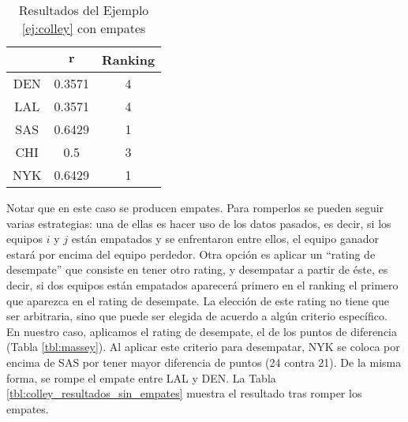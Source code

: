 \begin{ejemplo}
\begin{table}[h]
\centering
\caption{Resultados del Ejemplo \ref{ej:colley} con empates}
\label{tbl:colley_con_empates}
\begin{tabular}{@{}ccc@{}}
\cmidrule(l){2-3}
    & $\mathbf{r}$ & Ranking \\ \midrule
DEN & 0.3571       & 4       \\
LAL & 0.3571       & 4       \\
SAS & 0.6429       & 1       \\
CHI & 0.5          & 3       \\
NYK & 0.6429       & 1       \\ \bottomrule
\end{tabular}
\end{table}

Notar que en este caso se producen empates. Para romperlos se pueden seguir varias estrategias: una de ellas es hacer uso de los datos pasados, es decir, si los equipos $i$ y $j$ están empatados y se enfrentaron entre ellos, el equipo ganador estará por encima del equipo perdedor. Otra opción es aplicar un ``rating de desempate'' que consiste en tener otro rating, y desempatar a partir de éste, es decir, si dos equipos están empatados aparecerá primero en el ranking el primero que aparezca en el rating de desempate. La elección de este rating no tiene que ser arbitraria, sino que puede ser elegida de acuerdo a algún criterio específico.\\

En nuestro caso, aplicamos el rating de desempate, el de los puntos de diferencia (Tabla \ref{tbl:massey}). Al aplicar este criterio para desempatar, NYK se coloca por encima de SAS por tener mayor diferencia de puntos (24 contra 21). De la misma forma, se rompe el empate entre LAL y DEN. La Tabla \ref{tbl:colley_resultados_sin_empates} muestra el resultado tras romper los empates.


\end{ejemplo}
